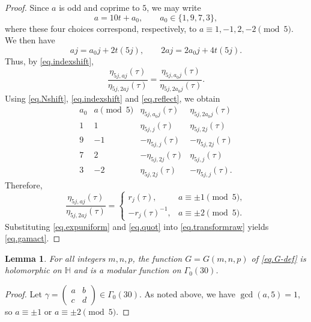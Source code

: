 \documentclass{amsart}
\newtheorem{lemma}[theorem]{Lemma}
\theoremstyle{definition}
\newcommand{\smat}[4]{\left(\begin{smallmatrix}#1&#2\\#3&#4\end{smallmatrix}\right)}
\begin{document}
{{\begin{proof}
Since $a$ is odd and coprime to $5$, we may write
\begin{equation*}
a=10t+a_0,
\qquad
a_0\in\{1,9,7,3\},
\end{equation*}
where these four choices correspond, respectively, to
$a\equiv1,-1,2,-2\pmod5$. We then have
\begin{equation*}
aj=a_0j+2t(5j),
\qquad
2aj=2a_0j+4t(5j).
\end{equation*}
Thus, by \eqref{eq.indexshift},
\begin{equation*}
\frac{\eta_{5j,aj}(\tau)}
{\eta_{5j,2aj}(\tau)}
=
\frac{\eta_{5j,a_0j}(\tau)}
{\eta_{5j,2a_0j}(\tau)}.
\end{equation*}	
Using \eqref{eq.Nshift}, \eqref{eq.indexshift} and \eqref{eq.reflect}, we obtain
\begin{equation*}
\begin{array}{c|c|c|c}
a_{0}
& a\pmod5
& \eta_{5j,a_{0}j}(\tau)
& \eta_{5j,2a_{0}j}(\tau)\\ \hline
1 & 1
& \eta_{5j,j}(\tau)
& \eta_{5j,2j}(\tau)\\
9 & -1
& -\eta_{5j,j}(\tau)
& -\eta_{5j,2j}(\tau)\\
7 & 2
& -\eta_{5j,2j}(\tau)
& \eta_{5j,j}(\tau)\\
3 & -2
& \eta_{5j,2j}(\tau)
& -\eta_{5j,j}(\tau).
\end{array}
\end{equation*}
Therefore,
\begin{equation}\label{eq.quot}
\frac{\eta_{5j,aj}(\tau)}
{\eta_{5j,2aj}(\tau)}
=
\begin{cases}
r_{j}(\tau),
& a\equiv\pm1\pmod5,\\[3pt]
-r_{j}(\tau)^{-1},
& a\equiv\pm2\pmod5.
\end{cases}
\end{equation}
Substituting \eqref{eq.expuniform} and \eqref{eq.quot} into
\eqref{eq.transformraw} yields \eqref{eq.gamact}.
\end{proof}


\begin{lemma}\label{lem.modularity}
For all integers $m,n,p$, the function $G=G(m,n,p)$ of \eqref{eq.G-def} is
holomorphic on $\mathbb{H}$ and is a modular function on $\Gamma_{0}(30)$.
\end{lemma}

\begin{proof}
Let $\gamma=\smat abcd\in\Gamma_{0}(30)$.  As noted  {above},
we have $\gcd(a,5)=1$, so $a\equiv\pm1$ or $a\equiv\pm2\pmod5$.


\end{proof}}}
\end{document}
